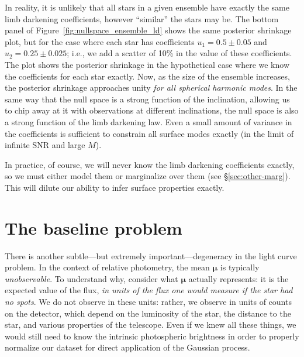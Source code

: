 \documentclass[modern]{aastex62}
\begin{document}
In reality, it is unlikely that all stars in a given ensemble have exactly
the same limb darkening coefficients, however ``similar'' the stars may be.
The bottom panel of Figure~\ref{fig:nullspace_ensemble_ld} shows the same
posterior shrinkage plot, but for the case where each star has coefficients
$u_1 = 0.5 \pm 0.05$ and $u_2 = 0.25 \pm 0.025$; i.e., we add a scatter of
10\% in the value of these coefficients. The plot shows the posterior
shrinkage in the hypothetical case where we know the coefficients for
each star exactly. Now, as the size of the ensemble increases, the posterior
shrinkage approaches unity \emph{for all spherical harmonic modes}.
In the same way that the null space is a strong function of the inclination,
allowing us to chip away at it with observations at different inclinations,
the null space is also a strong function of the limb darkening law. Even a
small amount of variance in the coefficients is sufficient to constrain all surface
modes exactly (in the limit of infinite SNR and large $M$).

In practice, of course, we will never know the limb darkening coefficients
exactly, so we must either model them or marginalize over them
(see \S\ref{sec:other-marg}). This will dilute our ability to infer surface
properties exactly.

\section{The baseline problem}
\label{sec:baseline}

There is another subtle---but extremely important---degeneracy in the
light curve problem.
%
%
In the context of
relative photometry, the mean $\pmb{\mu}$ is typically \emph{unobservable}.
%
To understand why, consider what
$\pmb{\mu}$ actually represents:
it is the expected value
of the flux,
\emph{in units of the flux one would measure if the star had no spots}.
We do not observe in these units: rather, we observe in units of counts on
the detector, which depend on the luminosity of the star, the distance to
the star, and various properties of the telescope. Even if we knew all these
things, we would still need to know the intrinsic photospheric brightness
in order to properly normalize our dataset for direct application of
the Gaussian process.
\end{document}
